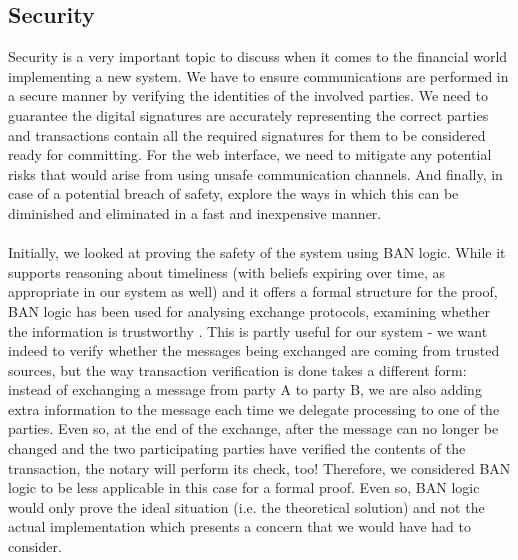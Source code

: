 \documentclass[12pt,twoside]{article}
\begin{document}
\subsection{Security}
\label{sub:Security}
Security is a very important topic to discuss when it comes to the financial world implementing a new system. We have to ensure communications are performed in a secure manner by verifying the identities of the involved parties. We need to guarantee the digital signatures are accurately representing the correct parties and transactions contain all the required signatures for them to be considered ready for committing. For the web interface, we need to mitigate any potential risks that would arise from using unsafe communication channels. And finally, in case of a potential breach of safety, explore the ways in which this can be diminished and eliminated in a fast and inexpensive manner.
\\ \\
Initially, we looked at proving the safety of the system using BAN logic. While it supports reasoning about timeliness (with beliefs expiring over time, as appropriate in our system as well) and it offers a formal structure for the proof, BAN logic has been used for analysing exchange protocols, examining whether the information is trustworthy \cite{banlg}. This is partly useful for our system - we want indeed to verify whether the messages being exchanged are coming from trusted sources, but the way transaction verification is done takes a different form: instead of exchanging a message from party A to party B, we are also adding extra information to the message each time we delegate processing to one of the parties. Even so, at the end of the exchange, after the message can no longer be changed and the two participating parties have verified the contents of the transaction, the notary will perform its check, too! Therefore, we considered BAN logic to be less applicable in this case for a formal proof. Even so, BAN logic would only prove the ideal situation (i.e. the theoretical solution) and not the actual implementation which presents a concern that we would have had to consider.
\end{document}
